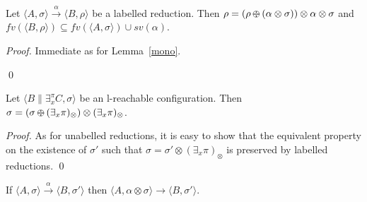 \documentclass{llncs}
\newcommand{\comment}[1]{}
\def\monid{{\mathbf 0}}
\def\odiv{\, {\ominus\hspace{-7.7pt} \div} \,}
\def\monid{\mathbf{1}}
\begin{document}
{\setcounter{lemma}{9}
\begin{lemma}
	\label{l-mono}
	Let $\langle A, \sigma \rangle \xrightarrow{\alpha} \langle B, \rho \rangle$ be a labelled reduction. 
	Then 
	$\rho = (\rho \odiv (\alpha \otimes \sigma)) \otimes \alpha \otimes \sigma$ and 
	$fv(\langle B, \rho \rangle) \subseteq fv(\langle A, \sigma \rangle) \cup sv(\alpha)$.
\end{lemma}
\begin {proof}
Immediate as for Lemma~\ref{mono}.
\comment{
	The first part is immediate as for Lemma~\ref{mono}.
	For the latter part, note that $\alpha \neq 1$ means that the proof of the reduction 
	uses only the axiom {\bf LA2}, and the property holds because 
	$\mathbb S$ is localised and $\rho = \alpha \otimes \sigma$.
	Let us check that the property 
	holds for {\bf LR2}. Inductively, we know that 
	$(\sigma_1 \odiv (\alpha \otimes \pi_0 \otimes \sigma)) = \monid$, and
	$(\alpha \otimes \sigma \otimes \exists_x ( \sigma_1 \odiv (\alpha \otimes \pi_0  \otimes \sigma))) \odiv (\alpha \otimes \sigma) = \monid$
	immediately follows.
}
\qed
\end{proof}

\setcounter{lemma}{10}
\begin{lemma}
	\label{l-mono2}
	Let 
	$\langle B \parallel \exists_x^\pi C, \sigma \rangle$ 
	be an l-reachable configuration. 
	Then 
	$\sigma = (\sigma \odiv (\exists_x \pi)_\otimes) \otimes (\exists_x \pi)_\otimes$.
\end{lemma}
\begin{proof}
	As for unabelled reductions, it is easy to show that the equivalent property
	on the existence of $\sigma'$ such that 
	$\sigma = \sigma' \otimes (\exists_x \pi)_\otimes$ is preserved by 
	labelled reductions. 
	\qed
\end{proof}

\setcounter{theorem}{0}
\begin{theorem}[Soundness]
	\label{sound}
	If $\langle A, \sigma \rangle \xrightarrow{\alpha} \langle B, \sigma' \rangle$
	then %
	$\langle A, \alpha \otimes \sigma \rangle \to \langle B, \sigma' \rangle$.
\end{theorem}

}
\end{document}
